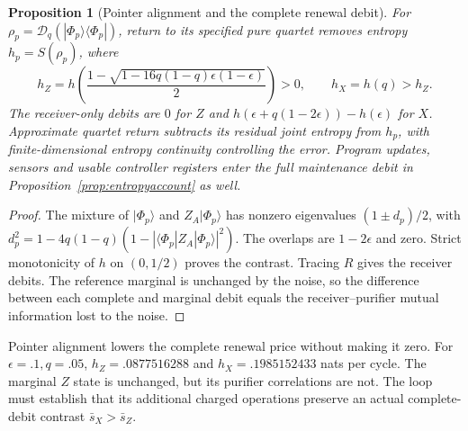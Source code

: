 \documentclass[12pt,a4paper]{article}
\newtheorem{proposition}[theorem]{Proposition}
\begin{document}
\begin{proposition}[Pointer alignment and the complete renewal debit]
\label{prop:pointer-debit}
For $\rho_p=\mathcal D_q(|\Phi_p\rangle\langle\Phi_p|)$, return to its
specified pure quartet removes entropy $h_p=S(\rho_p)$, where
\begin{equation}\label{eq:pointer-debit}
 h_Z=h\left(\frac{1-\sqrt{1-16q(1-q)\epsilon(1-\epsilon)}}2\right)>0,
 \qquad h_X=h(q)>h_Z.
\end{equation}
The receiver-only debits are $0$ for $Z$ and
$h(\epsilon+q(1-2\epsilon))-h(\epsilon)$ for $X$.
Approximate quartet return subtracts its residual joint entropy from
$h_p$, with finite-dimensional entropy continuity controlling the error.
Program updates, sensors and usable controller registers enter the full
maintenance debit in Proposition~\ref{prop:entropyaccount} as well.
\end{proposition}
\begin{proof}
The mixture of $|\Phi_p\rangle$ and $Z_A|\Phi_p\rangle$ has nonzero
eigenvalues $(1\pm d_p)/2$, with
$d_p^2=1-4q(1-q)(1-|\langle\Phi_p|Z_A|\Phi_p\rangle|^2)$.
The overlaps are $1-2\epsilon$ and zero. Strict monotonicity of $h$ on
$(0,1/2)$ proves the contrast. Tracing $R$ gives the receiver debits.
The reference marginal is unchanged by the noise, so the difference
between each complete and marginal debit equals the receiver--purifier
mutual information lost to the noise.
\end{proof}

Pointer alignment lowers the complete renewal price without making it
zero. For $\epsilon=.1,q=.05$,
$h_Z=.0877516288$ and $h_X=.1985152433$ nats per cycle.
The marginal $Z$ state is unchanged, but its purifier correlations are not.
The loop must establish that its additional charged operations preserve
an actual complete-debit contrast $\bar s_X>\bar s_Z$.
\end{document}
